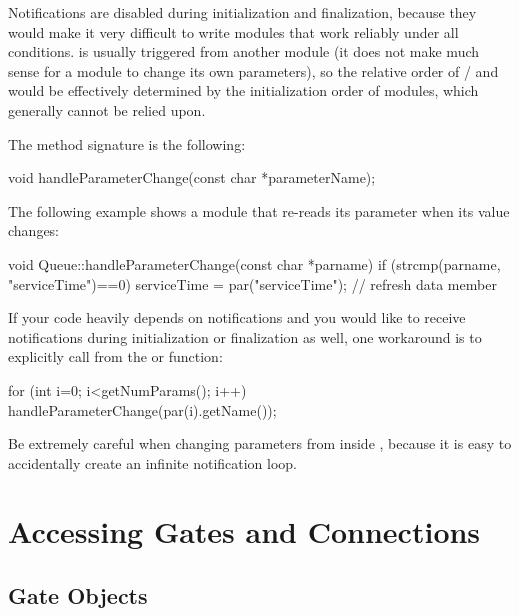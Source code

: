 \begin{note}
  Notifications are disabled during initialization and finalization,
  because they would make it very difficult to write modules
  that work reliably under all conditions.
   is usually triggered from another
  module (it does not make much sense for a module to change
  its own parameters), so the relative order of
   /  and 
  would be effectively determined by the initialization order
  of modules, which generally cannot be relied upon.
\end{note}

The method signature is the following:

\begin{cpp}
void handleParameterChange(const char *parameterName);
\end{cpp}

The following example shows a module that re-reads
its  parameter when its value changes:

\begin{cpp}
void Queue::handleParameterChange(const char *parname)
{
    if (strcmp(parname, "serviceTime")==0)
        serviceTime = par("serviceTime"); // refresh data member
}
\end{cpp}

If your code heavily depends on notifications and you would like to
receive notifications during initialization or finalization as well, one
workaround is to explicitly call 
from the  or  function:

\begin{cpp}
for (int i=0; i<getNumParams(); i++)
    handleParameterChange(par(i).getName());
\end{cpp}

\begin{note}
  Be extremely careful when changing parameters from inside
  , because it is easy to accidentally
  create an infinite notification loop.
\end{note}


\section{Accessing Gates and Connections}
\label{sec:simple-modules:gates}

\subsection{Gate Objects}

